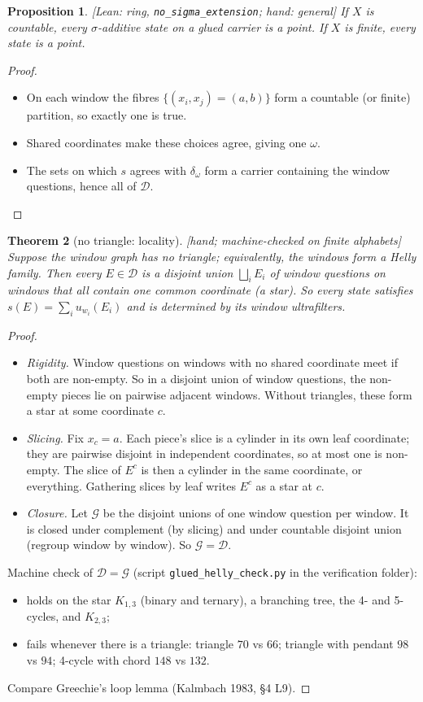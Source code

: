\documentclass[11pt]{article}
\theoremstyle{plain}
\newtheorem{theorem}{Theorem}[section]
\newtheorem{proposition}[theorem]{Proposition}
\theoremstyle{definition}
\newcommand{\cD}{\mathcal{D}}
\newcommand{\cG}{\mathcal{G}}
\newcommand{\st}[1]{\textsf{\small[#1]}}
\begin{document}
\begin{proposition}\label{prop:sigma}\st{Lean: ring, \texttt{no\_sigma\_extension};
hand: general}
If $X$ is countable, every $\sigma$-additive state on a glued carrier is a
point. If $X$ is finite, every state is a point.
\end{proposition}
\begin{proof}
\begin{itemize}[nosep]
  \item On each window the fibres $\{(x_i,x_j)=(a,b)\}$ form a countable (or
    finite) partition, so exactly one is true.
  \item Shared coordinates make these choices agree, giving one $\omega$.
  \item The sets on which $s$ agrees with $\delta_\omega$ form a carrier
    containing the window questions, hence all of $\cD$.
\end{itemize}
\end{proof}

\begin{theorem}[no triangle: locality]\label{thm:star}\label{lem:shape}\st{hand; machine-checked on finite alphabets}
Suppose the window graph has no triangle; equivalently, the windows form a Helly
family. Then every $E\in\cD$ is a disjoint union $\bigsqcup_i E_i$ of window
questions on windows that all contain one common coordinate (a star). So every
state satisfies $s(E)=\sum_i u_{w_i}(E_i)$ and is determined by its window
ultrafilters.
\end{theorem}
\begin{proof}
\begin{itemize}[nosep]
  \item \emph{Rigidity.} Window questions on windows with no shared coordinate
    meet if both are non-empty. So in a disjoint union of window questions, the
    non-empty pieces lie on pairwise adjacent windows. Without triangles, these
    form a star at some coordinate $c$.
  \item \emph{Slicing.} Fix $x_c=a$. Each piece's slice is a cylinder in its own
    leaf coordinate; they are pairwise disjoint in independent coordinates, so at
    most one is non-empty. The slice of $E^c$ is then a cylinder in the same
    coordinate, or everything. Gathering slices by leaf writes $E^c$ as a star at
    $c$.
  \item \emph{Closure.} Let $\cG$ be the disjoint unions of one window question
    per window. It is closed under complement (by slicing) and under countable
    disjoint union (regroup window by window). So $\cG=\cD$.
\end{itemize}
Machine check of $\cD=\cG$ (script \texttt{glued\_helly\_check.py} in the
verification folder):
\begin{itemize}[nosep]
  \item holds on the star $K_{1,3}$ (binary and ternary), a branching tree, the
    4- and 5-cycles, and $K_{2,3}$;
  \item fails whenever there is a triangle: triangle $70$ vs $66$; triangle with
    pendant $98$ vs $94$; 4-cycle with chord $148$ vs $132$.
\end{itemize}
Compare Greechie's loop lemma (Kalmbach 1983, \S4 L9).
\end{proof}
\end{document}
